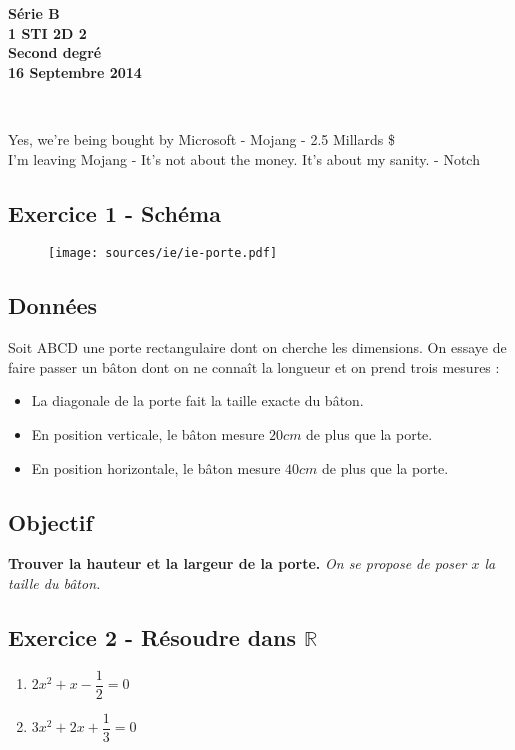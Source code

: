 \documentclass[11pt]{article}
\begin{document}

\begin{minipage}[t]{\textwidth}
  \raggedright
      {\bfseries Série B}\\[.35ex]
      {\bfseries 1 STI 2D 2}\\[.35ex]
      \vspace*{-1cm}
      \raggedleft
          {\bfseries Second degré}\\[.35ex]
          {\bfseries 16 Septembre 2014}\\[.35ex]
\end{minipage}\\[1em]

\begin{center}
  \textsf{Yes, we’re being bought by Microsoft - Mojang - 2.5 Millards \$}\\
  \textsf{I’m leaving Mojang - It’s not about the money. It’s about my sanity. - Notch}
\end{center}

\setlength{\columnseprule}{1pt}
\begin{multicols}{2}
  \subsection*{Exercice 1 - Schéma}
  \begin{figure}[H]
    \centering
    \texttt{[image: sources/ie/ie-porte.pdf]}
  \end{figure}
  \subsection*{Données}
  Soit ABCD une porte rectangulaire dont on cherche les dimensions. On essaye de faire passer un bâton dont on ne connaît la longueur et on prend trois mesures : 
  \begin{itemize}
  \item La diagonale de la porte fait la taille exacte du bâton.
  \item En position verticale, le bâton mesure $20cm$ de plus que la porte.
  \item En position horizontale, le bâton mesure $40cm$ de plus que la porte.
  \end{itemize}

  \subsection*{Objectif}
  \textbf{Trouver la hauteur et la largeur de la porte.}
  \textit{On se propose de poser $x$ la taille du bâton.}
\end{multicols}

\subsection*{Exercice 2 - Résoudre dans $\mathbb{R}$ }
\begin{multicols}{2}
  \begin{enumerate}
  \item $2x^2 + x - \dfrac{1}{2} = 0$
  \item $3x^2 + 2x + \dfrac{1}{3} = 0$
  \end{enumerate}
\end{multicols}
\end{document}

